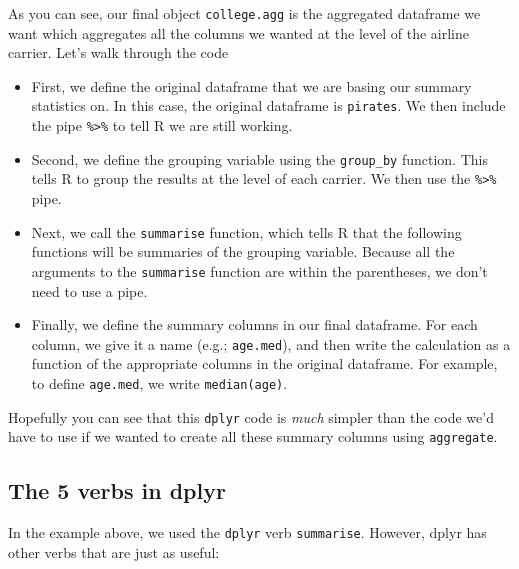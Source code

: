\documentclass{tufte-book}\usepackage[]{graphicx}\usepackage[]{color}
\begin{document}
\begin{footnotesize}
As you can see, our final object \texttt{college.agg} is the aggregated dataframe we want which aggregates all the columns we wanted at the level of the airline carrier. Let's walk through the code


\begin{itemize}
  \item First, we define the original dataframe that we are basing our summary statistics on. In this case, the original dataframe is \texttt{pirates}. We then include the pipe \texttt{\%>\%} to tell R we are still working.
  \item Second, we define the grouping variable using the \texttt{group\_by} function. This tells R to group the results at the level of each carrier. We then use the \texttt{\%>\%} pipe.
  \item Next, we call the \texttt{summarise} function, which tells R that the following functions will be summaries of the grouping variable. Because all the arguments to the \texttt{summarise} function are within the parentheses, we don't need to use a pipe.
  \item Finally, we define the summary columns in our final dataframe. For each column, we give it a name (e.g.; \texttt{age.med}), and then write the calculation as a function of the appropriate columns in the original dataframe. For example, to define \texttt{age.med}, we write \texttt{median(age)}.
  
\end{itemize}

Hopefully you can see that this \texttt{dplyr} code is \textit{much} simpler than the code we'd have to use if we wanted to create all these summary columns using \texttt{aggregate}.

\subsection{The 5 verbs in dplyr}

In the example above, we used the \texttt{dplyr} verb \texttt{summarise}. However, dplyr has other verbs that are just as useful:

\vspace{5mm} %
\noindent
\setlength{\fboxrule}{1.5pt}
\fbox{
\parbox{\textwidth}{

}}
\end{footnotesize}
\end{document}
